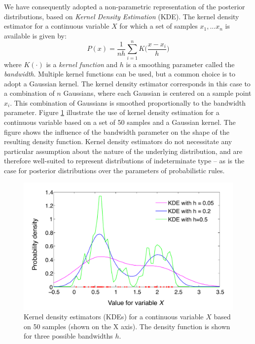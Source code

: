 We have consequently adopted a non-parametric representation of the posterior distributions, based on \textit{Kernel Density Estimation} (KDE).  The kernel density estimator for a continuous variable $X$ for which a set of samples $x_1, ... x_n$ is available is given by:
\begin{equation}
P(x) = \frac{1}{nh} \sum_{i=1}^n K\Big(\frac{x-x_i}{h}\Big) \label{eq:kde}
\end{equation}
where $K(\cdot)$ is a \textit{kernel function} and $h$ is a smoothing parameter called the \textit{bandwidth}. Multiple kernel functions can be used, but a common choice is to adopt a Gaussian kernel. The kernel density estimator corresponds in this case to a combination of $n$ Gaussians, where each Gaussian is centered on a sample point $x_i$.  This combination of Gaussians is smoothed proportionally to the bandwidth parameter. Figure \ref{fig:kde} illustrate the use of kernel density estimation for a continuous variable based on a set of 50 samples and a Gaussian kernel. The figure shows the influence of the bandwidth parameter on the shape of the resulting density function. Kernel density estimators do not necessitate any particular assumption about the nature of the underlying distribution, and are therefore well-suited to represent distributions of indeterminate type -- as is the case for posterior distributions over the parameters of probabilistic rules. 

\begin{figure}[h]
\centering
\includegraphics[scale=0.45]{imgs/kde.pdf} 
\caption{Kernel density estimators (KDEs) for a continuous variable $X$ based on 50 samples (shown on the X axis). The density function is shown for three possible bandwidths $h$. }
\label{fig:kde}
\end{figure}

